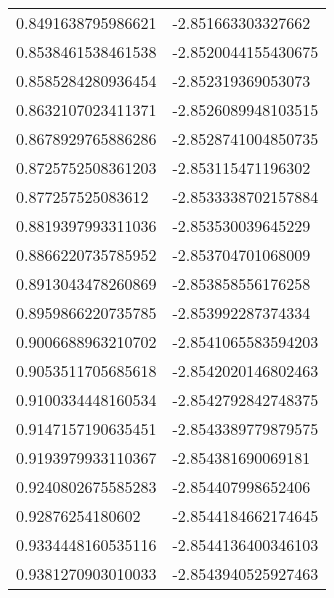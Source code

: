 \begin{supertabular}{ll}
0.8491638795986621  & -2.851663303327662   \\
0.8538461538461538  & -2.8520044155430675  \\
0.8585284280936454  & -2.852319369053073   \\
0.8632107023411371  & -2.8526089948103515  \\
0.8678929765886286  & -2.8528741004850735  \\
0.8725752508361203  & -2.853115471196302   \\
0.877257525083612   & -2.8533338702157884  \\
0.8819397993311036  & -2.853530039645229   \\
0.8866220735785952  & -2.853704701068009   \\
0.8913043478260869  & -2.853858556176258   \\
0.8959866220735785  & -2.853992287374334   \\
0.9006688963210702  & -2.8541065583594203  \\
0.9053511705685618  & -2.8542020146802463  \\
0.9100334448160534  & -2.8542792842748375  \\
0.9147157190635451  & -2.8543389779879575  \\
0.9193979933110367  & -2.854381690069181   \\
0.9240802675585283  & -2.854407998652406   \\
0.92876254180602    & -2.8544184662174645  \\
0.9334448160535116  & -2.8544136400346103  \\
0.9381270903010033  & -2.8543940525927463  \\
\end{supertabular}
